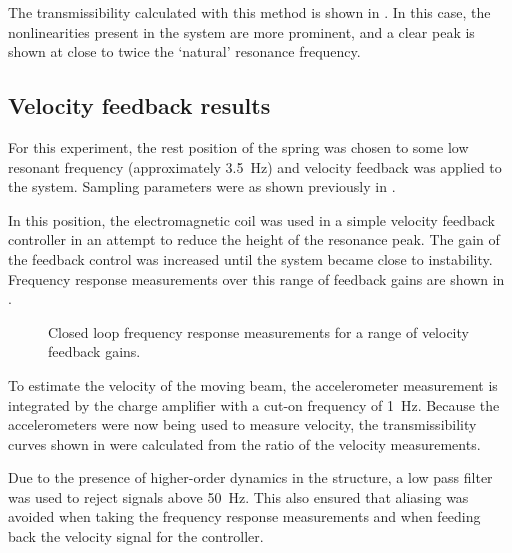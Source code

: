 \documentclass[11pt,a4paper]{memoir}
\begin{document}
The transmissibility calculated with this method is shown in
. In this case, the nonlinearities present in the
system are more prominent, and a clear peak is shown at close to twice the
`natural' resonance frequency.

\begin{figure}
\end{figure}

\subsection{Velocity feedback results}

For this experiment, the rest position of the spring was chosen to some low
resonant frequency (approximately \SI{3.5}{Hz}) and velocity feedback was applied
to the system. Sampling parameters were as shown previously in
.

In this position, the electromagnetic coil was used in a simple velocity
feedback controller in an attempt to reduce the height of the resonance peak.
The gain of the feedback control was increased until the system became close
to instability. Frequency response measurements over this range of feedback
gains are shown in .

\begin{figure}
  \caption{Closed loop frequency response measurements for a range of velocity feedback gains.}
\end{figure}

To estimate the velocity of the moving beam, the accelerometer measurement is
integrated by the charge amplifier with a cut-on frequency of \SI{1}{Hz}.
Because the accelerometers were now being used to measure velocity, the
transmissibility curves shown in  were calculated from the
ratio of the velocity measurements.

Due to the presence of higher-order dynamics in the structure, a low pass
filter was used to reject signals above \SI{50}{Hz}. This also ensured that
aliasing was avoided when taking the frequency response measurements and when
feeding back the velocity signal for the controller.
\end{document}
